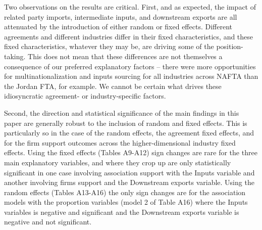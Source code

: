 \documentclass[hidelinks,12pt,letter]{article}
\begin{document}
Two observations on the results are critical. First, and as expected, the impact of related party imports, intermediate inputs, and downstream exports are all attenuated by the introduction of either random or fixed effects. Different agreements and different industries differ in their fixed characteristics, and these fixed characteristics, whatever they may be, are driving some of the position-taking. This does not mean that these differences are not themselves a consequence of our preferred explanatory factors -- there were more opportunities for multinationalization and inputs sourcing for all industries across NAFTA than the Jordan FTA, for example. We cannot be certain what drives these idiosyncratic agreement- or industry-specific factors. %

Second, the direction and statistical significance of the main findings in this paper are generally robust to the inclusion of random and fixed effects. This is particularly so in the case of the random effects, the agreement fixed effects, and for the firm support outcomes across the higher-dimensional industry fixed effects. Using the fixed effects (Tables A9-A12) sign changes are rare for the three main explanatory variables, and where they crop up are only statistically significant in one case involving association support with the Inputs variable and another involving firms support and the Downstream exports variable.  Using the random effects (Tables A13-A16) the only sign changes are for the association models with the proportion variables (model 2 of Table A16) where the Inputs variables is negative and significant and the Downstream exports variable is negative and not significant.  
\end{document}
